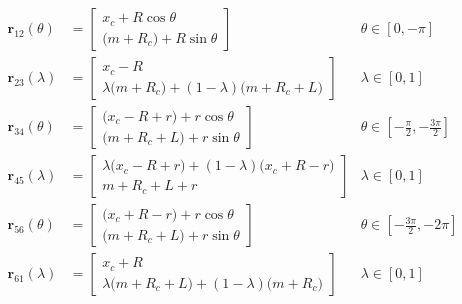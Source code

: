 \documentclass[a4paper,12pt,sort&compress]{article}
\newcommand{\vect}[1]{\ensuremath{\textbf{#1}}}
\begin{document}
    \begin{align*}
        \vect{r}_{12}(\theta)
        &=
        \begin{bmatrix}
            x_c + R\cos\theta\\
            \bigl(m+R_c\bigr)+R\sin\theta
        \end{bmatrix}
        & \theta\in[0,-\pi]\\
        \vect{r}_{23}(\lambda)&=
        \begin{bmatrix}
            x_c - R\\
            \lambda\bigl(m+R_c\bigr)+(1-\lambda)\bigl(m+R_c+L\bigr)
        \end{bmatrix}
        & \lambda\in[0,1]\\
        \vect{r}_{34}(\theta)&=
        \begin{bmatrix}
            \bigl(x_c - R + r\bigr) + r\cos\theta\\
            \bigl(m+R_c+L\bigr) + r\sin\theta
        \end{bmatrix}
        & \theta\in\left[-\frac{\pi}{2},-\frac{3\pi}{2}\right]\\
        \vect{r}_{45}(\lambda)&=
        \begin{bmatrix}
            \lambda\bigl(x_c-R+r\bigr)+(1-\lambda)\bigl(x_c+R-r\bigr)\\
            m+R_c+L+r
        \end{bmatrix}
        & \lambda\in[0,1]\\
        \vect{r}_{56}(\theta)&=
        \begin{bmatrix}
            \bigl(x_c + R - r\bigr) + r\cos\theta\\
            \bigl(m+R_c+L\bigr) + r\sin\theta
        \end{bmatrix}
        & \theta\in\left[-\frac{3\pi}{2},-2\pi\right]\\
        \vect{r}_{61}(\lambda)&=
        \begin{bmatrix}
            x_c + R\\
            \lambda\bigl(m+R_c+L\bigr)+(1-\lambda)\bigl(m+R_c\bigr)
        \end{bmatrix}
        & \lambda\in[0,1]\\
    \end{align*}
    
\end{document}
